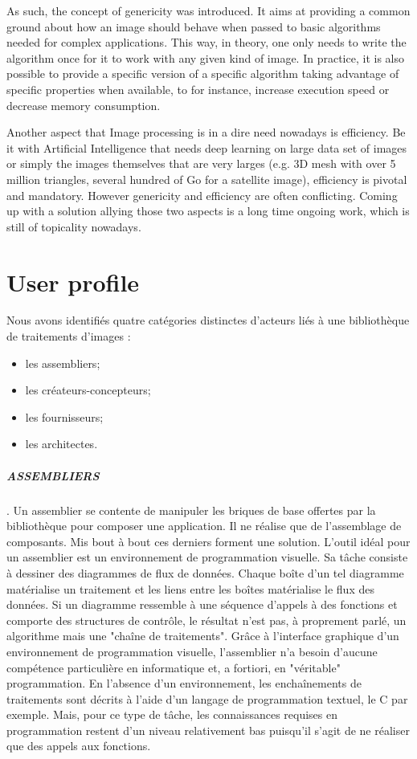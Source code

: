 As such, the concept of genericity was introduced. It aims at providing a common ground about how an image should behave
when passed to basic algorithms needed for complex applications. This way, in theory, one only needs to write the
algorithm once for it to work with any given kind of image. In practice, it is also possible to provide a specific
version of a specific algorithm taking advantage of specific properties when available, to for instance, increase
execution speed or decrease memory consumption.

Another aspect that Image processing is in a dire need nowadays is efficiency. Be it with Artificial Intelligence that
needs deep learning on large data set of images or simply the images themselves that are very larges (e.g. 3D mesh with
over 5 million triangles, several hundred of Go for a satellite image), efficiency is pivotal and mandatory. However
genericity and efficiency are often conflicting. Coming up with a solution allying those two aspects is a long time
ongoing work, which is still of topicality nowadays.

\chapter{User profile}

Nous avons identifiés quatre catégories distinctes d'acteurs liés à une bibliothèque de traitements
d'images :
\begin{itemize}
  \item les assembliers;
  \item les créateurs-concepteurs;
  \item les fournisseurs;
  \item les architectes.
\end{itemize}
\paragraph{ASSEMBLIERS}. Un assemblier se contente de manipuler les briques de base offertes par la
bibliothèque pour composer une application. Il ne réalise que de l'assemblage de composants. Mis
bout à bout ces derniers forment une solution. L'outil idéal pour un assemblier est un environnement
de programmation visuelle. Sa tâche consiste à dessiner des diagrammes de flux de données.
Chaque boîte d'un tel diagramme matérialise un traitement et les liens entre les boîtes matérialise
le flux des données. Si un diagramme ressemble à une séquence d'appels à des fonctions et
comporte des structures de contrôle, le résultat n'est pas, à proprement parlé, un algorithme mais
une "chaîne de traitements". Grâce à l'interface graphique d'un environnement de programmation
visuelle, l'assemblier n'a besoin d'aucune compétence particulière en informatique et, a fortiori, en
"véritable" programmation. En l'absence d'un environnement, les enchaînements de traitements
sont décrits à l'aide d'un langage de programmation textuel, le C par exemple. Mais, pour ce type de
tâche, les connaissances requises en programmation restent d'un niveau relativement bas puisqu'il
s'agit de ne réaliser que des appels aux fonctions.
